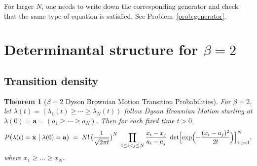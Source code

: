 \documentclass[letterpaper,11pt,oneside,reqno]{article}
\numberwithin{equation}{section}
\newtheorem{theorem}[proposition]{Theorem}
\theoremstyle{definition}
\begin{document}
For larger $N$, one needs to write down the corresponding generator and check
that the same type of equation is satisfied.
See Problem~\ref{prob:generator}.

\section{Determinantal structure for $\beta=2$}

\subsection{Transition density}



\begin{theorem}[\(\beta=2\) Dyson Brownian Motion Transition Probabilities]
	\label{thm:dbm-transition}
For \(\beta=2\), let \(\lambda(t)=(\lambda_1(t)\ge \cdots \ge \lambda_N(t))\) follow Dyson Brownian Motion starting at \(\lambda(0)=\mathbf{a}=(a_1\ge \cdots \ge a_N)\).  Then for each fixed time \(t>0\),
\[
P\bigl(\lambda(t) = \mathbf{x}\;\big|\;\lambda(0)=\mathbf{a}\bigr)
\;=\;
N!\,\bigl(\frac{1}{\sqrt{2\pi t}}\bigr)^{N}
\;\prod_{1\le i<j\le N}\frac{x_i - x_j}{a_i - a_j}
\;\det\Bigl[\exp\Bigl(-\frac{(x_i - a_j)^2}{2t}\Bigr)\Bigr]_{i,j=1}^N,
\]
where \(x_1 \ge \dots \ge x_N\).
\end{theorem}
\end{document}

